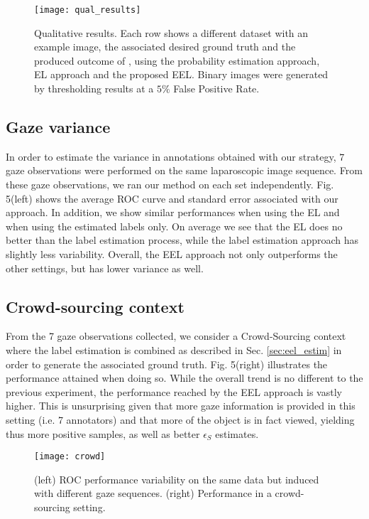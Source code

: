 \begin{figure}[ht]
\texttt{[image: qual\_results]}
\caption{Qualitative results. Each row shows a different dataset with an example image,
the associated desired ground truth and the produced outcome of \cite{vilarino07}, using the probability
estimation approach, EL approach and the proposed EEL.
Binary images were generated by thresholding results at a $5\%$ False Positive Rate.}
\label{fig:eel_qual_res}
\end{figure}



\subsection{Gaze variance}
In order to estimate the variance in annotations obtained with our strategy, $7$ gaze observations were performed on the same laparoscopic image sequence.
From these gaze observations, we ran our method on each set independently.
Fig. 5(left) shows the average ROC curve and standard error associated with our approach.
In addition, we show similar performances when using the EL and when using the estimated labels only.
On average we see that the EL does no better than the label estimation process, while the label estimation approach has slightly less variability.
Overall, the EEL approach not only outperforms the other settings, but has lower variance as well.

\subsection{Crowd-sourcing context}
From the 7 gaze observations collected, we consider a Crowd-Sourcing context where the label estimation is combined as described in Sec. \ref{sec:eel_estim} in order to generate the associated ground truth.
Fig. 5(right) illustrates the performance attained when doing so.
While the overall trend is no different to the previous experiment, the performance reached by the EEL approach is vastly higher.
This is unsurprising given that more gaze information is provided in this setting (i.e. 7 annotators) and that more of the object is in fact
viewed, yielding thus more positive samples, as well as better $\epsilon_{S}$ estimates.

\begin{figure}[ht]
\texttt{[image: crowd]}
\caption{(left) ROC performance variability on the same data but induced with different gaze
sequences. (right) Performance in a crowd-sourcing setting.}
\label{fig:eel_crowd}
\end{figure}

